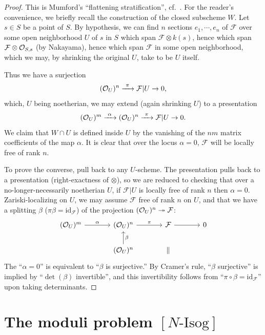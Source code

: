 \begin{proof}
This is Mumford's ``flattening stratification'', cf.\ \cite{Mum2}. For the reader's convenience, we briefly recall the construction of the closed subscheme $W$. Let $s \in S$ be a point of $S$. By hypothesis, we can find $n$ sections $e_1, \cdots, e_n$ of $\mathcal{F}$ over some open neighborhood $U$ of $s$ in $S$ which span $\mathcal{F}\otimes k(s)$, hence which span $\mathcal{F}\otimes\mathcal{O}_{S,s}$ (by Nakayama), hence which span $\mathcal{F}$ in some open neighborhood, which we may, by shrinking the original $U$, take to be $U$ itself.

Thus we have a surjection
\[
(\mathcal{O}_U)^n \xrightarrow{\ \pi\ } \mathcal{F}|U \to 0,
\]
which, $U$ being noetherian, we may extend (again shrinking $U$) to a presentation
\[
(\cO_U)^m \xrightarrow{\ \alpha\ } (\cO_U)^n \xrightarrow{\ \pi\ } \mathcal{F}|U \to 0.
\]
We claim that $W \cap U$ is defined inside $U$ by the vanishing of the $nm$ matrix coefficients of the map $\alpha$. It is clear that over the locus $\alpha = 0$, $\mathcal{F}$ will be locally free of rank $n$.

To prove the converse, pull back to any $U$-scheme. The presentation pulls back to a presentation (right-exactness of $\otimes$), so we are reduced to checking that over a no-longer-necessarily noetherian $U$, if $\mathcal{F}|U$ is locally free of rank $n$ then $\alpha = 0$. Zariski-localizing on $U$, we may assume $\mathcal{F}$ free of rank $n$ on $U$, and that we have a splitting $\beta$ ($\pi\beta = \mathrm{id}_{\mathcal{F}}$) of the projection $(\mathcal{O}_U)^n \twoheadrightarrow \mathcal{F}$:
\[
\begin{tikzcd}[column sep=large, every label/.append style={font=\scriptsize}]
(\cO_U)^m \arrow[r, "\alpha"] & (\cO_U)^n \arrow[r, "\pi"] & \mathcal{F} \arrow[r] & 0 \\
& (\cO_U)^n \arrow[u, "\beta"'] & \Vert
\end{tikzcd}
\]
The ``$\alpha = 0$'' is equivalent to ``$\beta$ is surjective.'' By Cramer's rule, ``$\beta$ surjective'' is implied by ``$\det(\beta)$ invertible'', and this invertibility follows from ``$\pi \circ \beta = \mathrm{id}_{\mathcal{F}}$'' upon taking determinants.
\end{proof}

\section{The moduli problem \texorpdfstring{$[N\text{-Isog}]$}{[N-Isog]}}
\label{sec:6.5}

